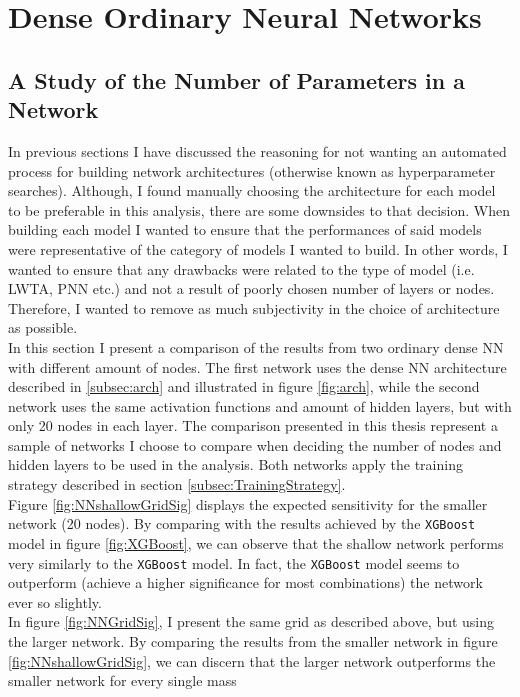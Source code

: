 \section{Dense Ordinary Neural Networks}
\subsection{A Study of the Number of Parameters in a Network}
In previous sections I have discussed the reasoning for not wanting an automated process for building network architectures (otherwise known
as hyperparameter searches). Although, I found manually choosing the architecture for each model to be preferable in this analysis, there 
are some downsides to that decision. When building each model I wanted to ensure that the performances of said models were representative of 
the category of models I wanted to build. In other words, I wanted to ensure that any drawbacks were related to the type of model (i.e. \ac{LWTA}, \ac{PNN} etc.) 
and not a result of poorly chosen number of layers or nodes. Therefore, I wanted to remove as much subjectivity in the choice of architecture as possible.
\\
In this section I present a comparison of the results from two ordinary dense \ac{NN} with different amount of nodes. The first network 
uses the dense \ac{NN} architecture described in \ref{subsec:arch} and illustrated in figure \ref{fig:arch}, while the second network uses the same activation 
functions and amount of hidden layers, but with only 20 nodes in each layer. The comparison presented in this thesis represent a sample of networks I choose to 
compare when deciding the number of nodes and hidden layers to be used in the analysis. Both networks apply the training strategy described in section 
\ref{subsec:TrainingStrategy}.
\\
Figure \ref{fig:NNshallowGridSig} displays the expected sensitivity for the smaller network (20 nodes). By comparing with the 
results achieved by the \verb!XGBoost! model in figure \ref{fig:XGBoost}, we can observe that the shallow network performs very similarly to the \verb!XGBoost! 
model. In fact, the \verb!XGBoost! model seems to outperform (achieve a higher significance for most combinations) the network ever so slightly.
\\
In figure \ref{fig:NNGridSig}, I present the same grid as described above, but using the larger network. By comparing the results from the smaller 
network in figure \ref{fig:NNshallowGridSig}, we can discern that the larger network outperforms the smaller network for every single mass 
